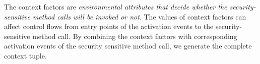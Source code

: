 The context factors are \textit{environmental attributes that decide whether the security-sensitive method calls will be invoked or not}. The values of context factors can affect control flows from
entry points of the activation events to the security-sensitive
method call. By combining the context
factors with corresponding activation events of the security sensitive
method call, we generate the complete context tuple.

%
%
